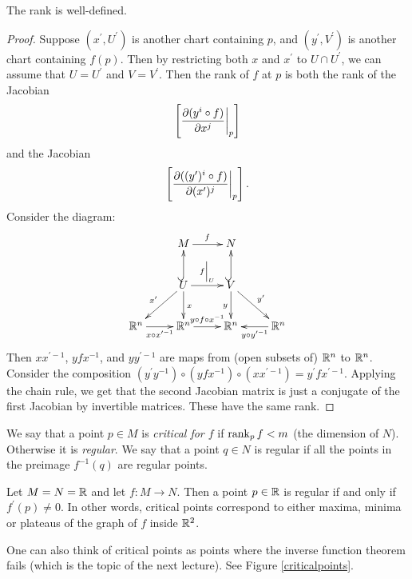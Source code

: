 \documentclass[11pt, english]{article}
\begin{document}
\begin{prop}
The rank is well-defined.
\end{prop}
\begin{proof}
Suppose $(x^\prime,U^\prime)$ is another chart containing $p$, and $(y^\prime,V^\prime)$ is another chart containing $f(p)$. Then by restricting both $x$ and $x^\prime$ to $U \cap U^\prime$, we can assume that $U=U^\prime$ and $V=V^\prime$. Then the rank of $f$ at $p$ is both the rank of the Jacobian
\[
\left[ \restr{\dd{(y^i \circ f)}{x^j}}p \right]
\]
and the Jacobian
\[
\left[ \restr{\dd{((y^\prime)^i \circ f)}{(x^\prime)^j}}p \right].
\]
Consider the diagram:
\[
\xymatrix{
& M \ar[r]^f & N \\
& \ar[dl]_{x^\prime} U \ar@{^(->}[u] \ar[d]^x \ar[r]^{\restr fU} & V \ar@{^(->}[u] \ar[d]_y  \ar[dr]^{y^\prime}\\
\R^n \ar[r]_{x \circ x^{\prime -1}} & \R^n \ar[r]^{y \circ f \circ x^{-1}} & \R^n & \ar[l]^{y \circ y^{\prime -1}}\R^n
}
\]
Then $xx^{\prime -1}$, $yfx^{-1}$, and $y y^{\prime -1}$ are maps from (open subsets of) $\mathbb{R}^n$ to $\mathbb{R}^n$. Consider the composition $(y^\prime y^{-1}) \circ (yfx^{-1}) \circ (xx^{\prime -1})=y^\prime f x^{\prime -1}$. Applying the chain rule, we get that the second Jacobian matrix is just a conjugate of the first Jacobian by invertible matrices. These have the same rank.
\end{proof}

We say that a point $p \in M$ is \emph{critical for $f$} if $\operatorname{\mathrm{rank}}_p f < m$ (the dimension of $N$). Otherwise it is \emph{regular}. We say that a point $q \in N$ is regular if all the points in the preimage $f^{-1}(q)$ are regular points.

\begin{example}
Let $M=N=\mathbb{R}$ and let $f:M \to N$. Then a point $p \in \mathbb{R}$ is regular if and only if $f^\prime(p) \neq 0$. In other words, critical points correspond to either maxima, minima or plateaus of the graph of $f$ inside $\mathbb{R}^2$.

One can also think of critical points as points where the inverse function theorem fails (which is the topic of the next lecture). See Figure \ref{criticalpoints}. %
\end{example}
\end{document}
